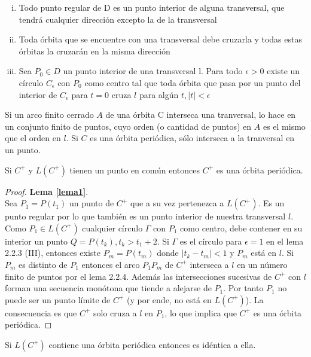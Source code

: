  \begin{lemma}
 	\begin{enumerate}[i.]
 		\item Todo punto regular de D es un punto interior de alguna transversal, que tendrá cualquier dirección excepto la de la transversal
 		\item Toda órbita que se encuentre con una transversal debe cruzarla y todas estas órbitas la cruzarán en la misma dirección
 		\item Sea $P_0 \in D $ un punto interior de una transversal l. Para todo $\epsilon>0$ existe  un círculo $C_\epsilon$ con $P_0$ como centro tal que toda órbita que pasa por un  punto del interior de $C_\epsilon$ para $t=0$ cruza $l$ para algún $t, |t|< \epsilon$ 
 	\end{enumerate}
 \end{lemma}
 \begin{lemma}
 	Si un arco finito cerrado $A$ de una órbita C interseca una tranversal, lo hace en un conjunto finito de puntos, cuyo orden (o cantidad de puntos) en $A$ es el mismo que el orden en $l$. Si $C$ es una órbita periódica, sólo interseca a la tranversal en un punto.
 \end{lemma}
 \begin{lemma}
 	Si $C^+$ y $L(C^+)$ tienen un punto en común entonces $C^+$ es una órbita periódica.
 	\label{lema1}
 \end{lemma}
 \begin{proof} \textbf{Lema \ref{lema1}}.\\ 
 	Sea $P_1=P(t_1)$ un punto de $C^+$ que a su vez pertenezca a $L(C^+)$. Es un punto regular por lo que también es un punto interior de nuestra transversal $l$. Como $P_1 \in L(C^+)$ cualquier círculo $\Gamma$ con $P_1$ como centro, debe contener en su interior un punto $Q=P(t_k), t_k>t_1+2$. Si $\Gamma$ es el círculo para $\epsilon=1$ en el lema 2.2.3 (III), entonces existe $P_m=P(t_m)$ donde $|t_k-t_m|<1$ y $P_m$ está en $l$. Si $P_m$ es distinto de $P_1$ entonces el arco $P_1P_m$ de $C^+$ interseca a $l$ en un número finito de puntos por el lema 2.2.4. Además las intersecciones sucesivas de $C^+$ con $l$ forman una secuencia monótona que tiende a alejarse de $P_1$. Por tanto $P_1$ no puede ser un punto límite de $C^+$ (y por ende, no está en $L(C^+)$). La consecuencia es que $C^+$ solo cruza a $l$ en $P_1$, lo que implica que $C^+$ es una órbita periódica.
 \end{proof}
 \begin{lemma}
 	Si $L(C^+)$ contiene una órbita periódica entonces es idéntica a ella.
 	\label{lema2}
 \end{lemma}
